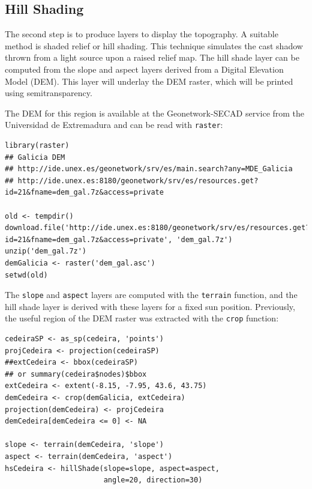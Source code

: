 \documentclass[smallroyalvopaper]{memoir}
\begin{document}
\subsection{Hill Shading}
\label{sec-1-2}

The second step is to produce layers to display the topography. A
suitable method is shaded relief or hill shading. This technique
simulates the cast shadow thrown from a light source upon a raised
relief map. The hill shade layer can be computed from the slope and
aspect layers derived from a Digital Elevation Model (DEM). This layer
will underlay the DEM raster, which will be printed using
semitransparency.

The DEM for this region is available at the Geonetwork-SECAD service
from the Universidad de Extremadura and can be read with \texttt{raster}:


\lstset{language=R,numbers=none}
\begin{lstlisting}
library(raster)
## Galicia DEM
## http://ide.unex.es/geonetwork/srv/es/main.search?any=MDE_Galicia
## http://ide.unex.es:8180/geonetwork/srv/es/resources.get?id=21&fname=dem_gal.7z&access=private

old <- tempdir()
download.file('http://ide.unex.es:8180/geonetwork/srv/es/resources.get?id=21&fname=dem_gal.7z&access=private', 'dem_gal.7z')
unzip('dem_gal.7z')
demGalicia <- raster('dem_gal.asc')
setwd(old)
\end{lstlisting}

The \texttt{slope} and \texttt{aspect} layers are computed with the \texttt{terrain}
function, and the hill shade layer is derived with these layers for a
fixed sun position. Previously, the useful region of the DEM raster
was extracted with the \texttt{crop} function:


\lstset{language=R,numbers=none}
\begin{lstlisting}
cedeiraSP <- as_sp(cedeira, 'points')
projCedeira <- projection(cedeiraSP)
##extCedeira <- bbox(cedeiraSP) 
## or summary(cedeira$nodes)$bbox
extCedeira <- extent(-8.15, -7.95, 43.6, 43.75)
demCedeira <- crop(demGalicia, extCedeira)
projection(demCedeira) <- projCedeira
demCedeira[demCedeira <= 0] <- NA

slope <- terrain(demCedeira, 'slope')
aspect <- terrain(demCedeira, 'aspect')
hsCedeira <- hillShade(slope=slope, aspect=aspect,
                       angle=20, direction=30)
\end{lstlisting}
\end{document}
